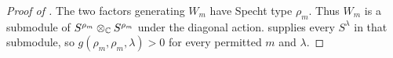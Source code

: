 \begin{proof}[Proof of ]
The two factors generating $W_m$ have Specht type $\rho_m$.
Thus $W_m$ is a submodule of
$S^{\rho_m}\otimes_{\mathbb C}S^{\rho_m}$ under the diagonal action.
 supplies every $S^\lambda$ in that submodule,
so $g(\rho_m,\rho_m,\lambda)>0$ for every permitted $m$ and $\lambda$.
\end{proof}
